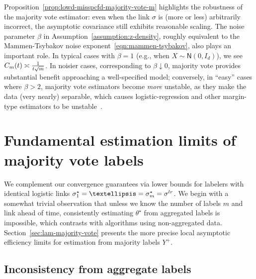 \documentclass[11pt]{article}
\newcommand{\majY}{Y^+}
\newcommand{\normal}{\mathsf{N}}
\newcommand{\lr}{^{\textup{lr}}}
\newcommand{\mv}{^{\textup{mv}}}
\newcommand{\<}{\langle} %
\renewcommand{\>}{\rangle}
\newcommand{\opt}{^\star}
\begin{document}
Proposition~\ref{prop:lowd-misspcfd-majority-vote-m} highlights the robustness
of the majority vote estimator: even when the link $\sigma$ is (more
or less) arbitrarily incorrect, the asymptotic covariance still
exhibits reasonable scaling. The noise parameter $\beta$ in
Assumption~\ref{assumption:z-density}, roughly equivalent to the
Mammen-Tsybakov noise exponent~\eqref{eqn:mammen-tsybakov}, also plays
an important role. In typical cases with $\beta = 1$ (e.g., when
$X \sim \normal(0, I_d)$), we see $C_m(t) \asymp \frac{1}{t \sqrt{m}}$.
In noisier cases, corresponding to $\beta \downarrow 0$, majority vote
provides substantial benefit approaching a well-specified model; conversely,
in ``easy'' cases where $\beta > 2$, majority vote estimators become
\emph{more} unstable, as they make the data (very nearly) separable,
which causes logistic-regression and other margin-type estimators to be
unstable~\cite{CandesSu19pnas}.


\newcommand{\fisher}{\mathsf{I}}
\newcommand{\fishermv}{\fisher\mv}

\section{Fundamental estimation limits of majority vote labels}
\label{sec:lower-bound}

We complement our convergence guarantees via lower bounds for labelers with
identical logistic links $\sigma_1\opt = \dots = \sigma_m\opt = \sigma\lr$.
We begin with a somewhat trivial observation that unless we know the number
of labels $m$ and link ahead of time, consistently estimating $\theta\opt$
from aggregated labels is impossible, which contrasts with algorithms using
non-aggregated data. Section~\ref{sec:lam-majority-vote} presents the more
precise local asymptotic efficiency limits for estimation from majority
labels $\majY$.

\subsection{Inconsistency from aggregate labels}
\label{sec:imp-mv}
\end{document}
